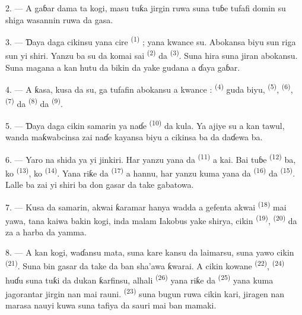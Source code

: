 2. --- A gaɓar dama ta kogi, masu tuƙa jirgin ruwa suna tuɓe tufafi
domin su shiga wasannin ruwa da gasa.

3. --- Ɗaya daga cikinsu yana cire 
\textsuperscript{(1)} ; yana kwance su. Abokansa biyu sun riga sun yi
shiri. Yanzu ba su da komai sai 
\textsuperscript{(2)} da  \textsuperscript{(3)}. Suna
hira suna jiran abokansu. Suna magana a kan hutu da bikin da yake
gudana a ɗaya gaɓar.

4. --- A ƙasa, kusa da su, ga tufafin abokansu a kwance :
 \textsuperscript{(4)} guda biyu,
 \textsuperscript{(5)}, 
\textsuperscript{(6)},  \textsuperscript{(7)} da
 \textsuperscript{(8)} da 
\textsuperscript{(9)}.

5. --- Ɗaya daga cikin samarin ya naɗe 
\textsuperscript{(10)} da kula. Ya ajiye su a kan tawul, wanda
maƙwabcinsa zai naɗe kayansa biyu a cikinsa ba da daɗewa ba.

6. --- Yaro na shida ya yi jinkiri. Har yanzu yana da
 \textsuperscript{(11)} a kai. Bai tuɓe
 \textsuperscript{(12)} ba, ko  \textsuperscript{(13)}, ko 
\textsuperscript{(14)}. Yana riƙe da 
\textsuperscript{(17)} a hannu, har yanzu kuma yana da
 \textsuperscript{(16)} da 
\textsuperscript{(15)}. Lalle ba zai yi shiri ba don gasar da take
gabatowa.

7. --- Kusa da samarin, akwai ƙaramar hanya wadda a gefenta akwai
 \textsuperscript{(18)} mai yawa, tana kaiwa
bakin kogi, inda malam Iakobus yake shirya, cikin 
\textsuperscript{(19)},  \textsuperscript{(20)} da za
a harba da yamma.

\VUsaut{4.4mm}
\VUsaut{3.4mm}

8. --- A kan kogi, waɗansu mata, suna kare kansu da laimarsu, suna
yawo cikin  \textsuperscript{(21)}. Suna bin gasar
da take da ban sha’awa ƙwarai. A cikin kowane 
\textsuperscript{(22)},  \textsuperscript{(24)} huɗu
suna tuƙi da dukan ƙarfinsu, alhali 
\textsuperscript{(26)} yana riƙe da 
\textsuperscript{(25)} yana kuma jagorantar jirgin nan mai rauni.
 \textsuperscript{(23)} suna bugun ruwa cikin
kari, jiragen nan marasa nauyi kuwa suna tafiya da sauri mai ban
mamaki.

